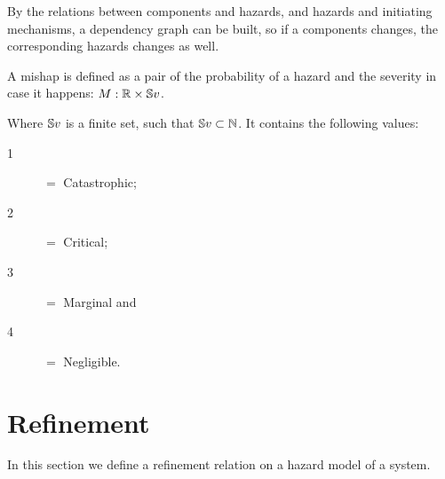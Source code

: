 By the relations between components and hazards, and hazards and initiating mechanisms, a dependency graph can be built, so if a components changes, the corresponding hazards changes as well.

\begin{definition}[Mishap]
A mishap is defined as a pair of the probability of a hazard and the severity in case it happens: $M: \mathbb{R}\times\mathbb{S}v$.
\end{definition}
%
\noindent Where $\mathbb{S}v$ is a finite set, such that $\mathbb{S}v \subset \mathbb{N}$. It contains the following values:
\begin{description}
  \item[1] $=$ Catastrophic;
  \item[2] $=$ Critical;
  \item[3] $=$ Marginal and
  \item[4] $=$ Negligible.
\end{description}

\section{Refinement}

In this section we define a refinement relation on a hazard model of a system.


